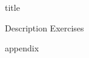 \documentclass{article}
\begin{document}
{title}

\frontmatter

\tableofcontents
\newpage

\listoffigures
\newpage

\mainmatter

{Description}
\newpage
{Exercises}
\newpage

\nocite{dc_electric_motors}
\nocite{nisens2020}
\printbibliography[heading = bibintoc, title = Referanser]    %

\addappendix
{appendix}

\end{document}
